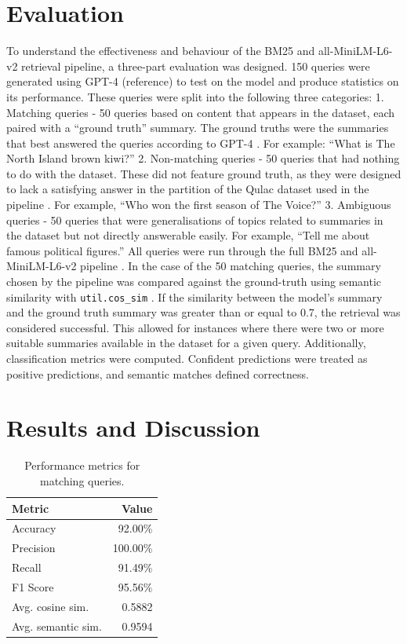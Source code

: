 \documentclass[11pt]{article}
\begin{document}
\section{Evaluation}
To understand the effectiveness and behaviour of the BM25 and all-MiniLM-L6-v2 retrieval pipeline, a three-part evaluation was designed. 150 queries were generated using GPT-4 (reference) to test on the model and produce statistics on its performance. These queries were split into the following three categories:
1. Matching queries - 50 queries based on content that appears in the dataset, each paired with a “ground truth” summary. The ground truths were the summaries that best answered the queries according to GPT-4 \cite{OpenAI2025}. For example: “What is The North Island brown kiwi?”
2. Non-matching queries - 50 queries that had nothing to do with the dataset. These did not feature ground truth, as they were designed to lack a satisfying answer in the partition of the Qulac dataset used in the pipeline \cite{Aliannejadi2021}. For example, “Who won the first season of The Voice?”
3. Ambiguous queries - 50 queries that were generalisations of topics related to summaries in the dataset but not directly answerable easily. For example, “Tell me about famous political figures.”
All queries were run through the full BM25 and all-MiniLM-L6-v2 pipeline \cite{Brown2022,Tomaarsen2025a}. In the case of the 50 matching queries, the summary chosen by the pipeline was compared against the ground-truth using semantic similarity with \texttt{util.cos\_sim} \cite{Tomaarsen2025b}. If the similarity between the model's summary and the ground truth summary was greater than or equal to 0.7, the retrieval was considered successful. This allowed for instances where there were two or more suitable summaries available in the dataset for a given query. Additionally, classification metrics were computed. Confident predictions were treated as positive predictions, and semantic matches defined correctness.

\section{Results and Discussion}

\begin{table}[t]
  \centering
  \begin{tabular}{lr}
    \textbf{Metric} & \textbf{Value} \\
    \hline
    Accuracy & 92.00\% \\
    Precision & 100.00\% \\
    Recall & 91.49\% \\
    F1 Score & 95.56\% \\
    Avg. cosine sim. & 0.5882 \\
    Avg. semantic sim. & 0.9594 \\
  \end{tabular}
  \caption{Performance metrics for matching queries.}
  \label{tab:matching-metrics}
\end{table}
\end{document}
